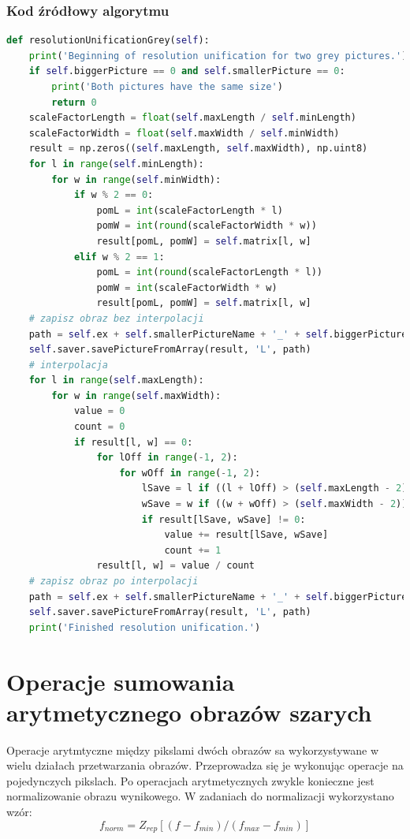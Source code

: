 \documentclass[a4paper,12pt, titlepage]{report}
\begin{document}
\subsection*{Kod źródłowy algorytmu}
\begin{lstlisting}[language=Python]
def resolutionUnificationGrey(self):
    print('Beginning of resolution unification for two grey pictures.')
    if self.biggerPicture == 0 and self.smallerPicture == 0:
        print('Both pictures have the same size')
        return 0
    scaleFactorLength = float(self.maxLength / self.minLength)
    scaleFactorWidth = float(self.maxWidth / self.minWidth)
    result = np.zeros((self.maxLength, self.maxWidth), np.uint8)
    for l in range(self.minLength):
        for w in range(self.minWidth):
            if w % 2 == 0:
                pomL = int(scaleFactorLength * l)
                pomW = int(round(scaleFactorWidth * w))
                result[pomL, pomW] = self.matrix[l, w]
            elif w % 2 == 1:
                pomL = int(round(scaleFactorLength * l))
                pomW = int(scaleFactorWidth * w)
                result[pomL, pomW] = self.matrix[l, w]
    # zapisz obraz bez interpolacji
    path = self.ex + self.smallerPictureName + '_' + self.biggerPictureName + '_withoutInterpolation.png'
    self.saver.savePictureFromArray(result, 'L', path)
    # interpolacja
    for l in range(self.maxLength):
        for w in range(self.maxWidth):
            value = 0
            count = 0
            if result[l, w] == 0:
                for lOff in range(-1, 2):
                    for wOff in range(-1, 2):
                        lSave = l if ((l + lOff) > (self.maxLength - 2)) | ((l + lOff) < 0) else (l + lOff)
                        wSave = w if ((w + wOff) > (self.maxWidth - 2)) | ((w + wOff) < 0) else (w + wOff)
                        if result[lSave, wSave] != 0:
                            value += result[lSave, wSave]
                            count += 1
                result[l, w] = value / count
    # zapisz obraz po interpolacji
    path = self.ex + self.smallerPictureName + '_' + self.biggerPictureName + '_withInterpolation.png'
    self.saver.savePictureFromArray(result, 'L', path)
    print('Finished resolution unification.')
\end{lstlisting}

\chapter{Operacje sumowania arytmetycznego obrazów szarych}
Operacje arytmtyczne między pikslami dwóch obrazów sa wykorzystywane w wielu działach przetwarzania obrazów. Przeprowadza się je wykonując operacje na pojedynczych pikslach. Po operacjach arytmetycznych zwykle konieczne jest normalizowanie obrazu wynikowego. W zadaniach do normalizacji wykorzystano wzór:
\[f_{norm}=Z_{rep}[(f-f_{min})/(f_{max}-f_{min})]\]
\end{document}
